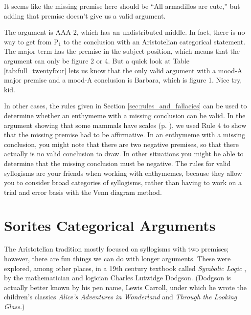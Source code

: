 \begin{kormanize}
\end{kormanize}

It seems like the missing premise here should be ``All armadillos are cute,''  but adding that premise doesn't give us a valid argument.

\begin{kormanize}
\end{kormanize}

The argument is AAA-2, which has an undistributed middle. In fact, there is no way to get from P$_1$ to the conclusion with an Aristotelian categorical statement. The major term has the premise in the subject position, which means that the argument can only be figure 2 or 4. But a quick look at Table \ref{tab:full_twentyfour} lets us know that the only valid argument with a mood-A major premise and a mood-A conclusion is Barbara, which is figure 1. Nice try, kid.

In other cases, the rules given in Section \ref{sec:rules_and_fallacies} can be used to determine whether an enthymeme with a missing conclusion can be valid. In the argument showing that some mammals have scales (p. \pageref{rule_use}), we used Rule 4 to show that the missing premise had to be affirmative. In an enthymeme with a missing conclusion, you might note that there are two negative premises, so that there actually is no valid conclusion to draw. In other situations you might be able to determine that the missing conclusion must be negative. The rules for valid syllogisms are your friends when working with enthymemes, because they allow you to consider broad categories of syllogisms, rather than having to work on a trial and error basis with the Venn diagram method.


\section{Sorites Categorical Arguments }

The Aristotelian tradition mostly focused on syllogisms with two premises; however, there are fun things we can do with longer arguments. These were explored, among other places, in a 19th century textbook called \textit{Symbolic Logic} \citep{Dodgson1896}, by the mathematician and logician Charles Lutwidge Dodgson. (Dodgson is actually better known by his pen name, Lewis Carroll, under which he wrote the children's classics \textit{Alice's Adventures in Wonderland} and \textit{Through the Looking Glass}.)

